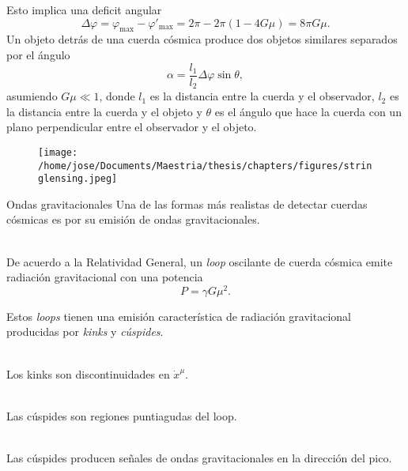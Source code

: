 \documentclass[14pt]{beamer}
\begin{document}
\begin{frame}
 Esto implica una deficit angular 
\begin{equation*}
\Delta \varphi = \varphi_{\text{max}} - \varphi'_{\text{max}} = 2\pi -2\pi(1-4G\mu) = 8\pi G\mu.
\end{equation*}
Un objeto detrás de una cuerda cósmica produce dos objetos similares separados por el ángulo
\begin{equation*}
	\alpha = \frac{l_1}{l_2}\Delta\varphi\sin\theta,
\end{equation*}
asumiendo $G\mu\ll 1$, donde $l_1$ es la distancia entre la cuerda y el observador, $l_2$ es la distancia entre la cuerda y el objeto y $\theta$ es el ángulo que hace la cuerda con un plano perpendicular entre el observador y el objeto. 
\end{frame}

\begin{frame}
\begin{figure}
	\centering
	\texttt{[image: /home/jose/Documents/Maestria/thesis/chapters/figures/stringlensing.jpeg]}
\end{figure} 
\end{frame}


\begin{frame}{Ondas gravitacionales}
Una de  las formas más realistas de detectar cuerdas cósmicas es por su emisión de ondas gravitacionales.\\~\

De acuerdo a la Relatividad General, un \textit{loop} oscilante de cuerda cósmica emite radiación gravitacional con una potencia
\begin{equation*}
	P = \gamma G \mu^2.
\end{equation*}

\end{frame}

\begin{frame}

	Estos \textit{loops} tienen una emisión característica de radiación gravitacional producidas por \textit{kinks} y \textit{cúspides}.\\~\

	Los kinks son discontinuidades en $\dot x^{\mu}$. \\~\

	Las cúspides son regiones puntiagudas del loop.\\~\
	
	Las cúspides producen señales de ondas gravitacionales en la dirección del pico.
	
\end{frame}
\end{document}
